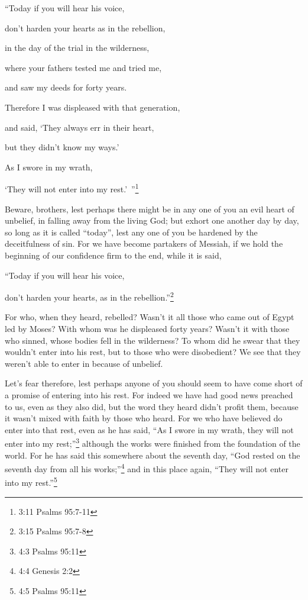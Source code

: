 “Today if you will hear his voice,

\myverse{}don’t harden your hearts as in the rebellion,

in the day of the trial in the wilderness,

\myverse{}where your fathers tested me and tried me,

and saw my deeds for forty years.

\myverse{}Therefore I was displeased with that generation,

and said, ‘They always err in their heart,

but they didn’t know my ways.’

\myverse{}As I swore in my wrath,

‘They will not enter into my rest.’ ”\footnote{3:11 Psalms 95:7-11}

\myverse{}Beware, brothers, lest perhaps there might be in any one of you
an evil heart of unbelief, in falling away from the living God;
\myverse{}but exhort one another day by day, so long as it is called “today”, lest any
one of you be hardened by the deceitfulness of sin.
\myverse{}For we have become partakers of Messiah, if we hold the beginning of our confidence
firm to the end,
\myverse{}while it is said,

“Today if you will hear his voice,

don’t harden your hearts, as in the rebellion.”\footnote{3:15 Psalms 95:7-8}

\myverse{}For who, when they heard, rebelled? Wasn’t it all those who came
out of Egypt led by Moses?
\myverse{}With whom was he displeased forty years? Wasn’t it with those who sinned,
whose bodies fell in the wilderness?
\myverse{}To whom did he swear that they wouldn’t enter into his rest, but to those
who were disobedient?
\myverse{}We see that they weren’t able to enter in because of unbelief.


\mychapter{} \myverse*{}Let’s fear therefore, lest perhaps anyone of you should seem to
have come short of a promise of entering into his rest.
\myverse{}For indeed we have had good news preached to us, even as they also did, but
the word they heard didn’t profit them, because it wasn’t mixed with faith by those who heard.
\myverse{}For we who have believed do enter into that rest, even as he has said, “As I
swore in my wrath, they will not enter into my rest;”\footnote{4:3 Psalms 95:11
} although the works were finished from the foundation of the world.
\myverse{}For he has said this somewhere about the seventh day, “God rested on the seventh
day from all his works;”\footnote{4:4 Genesis 2:2}
\myverse{}and in this place again, “They will not enter into my rest.”\footnote{4:5 Psalms 95:11}

